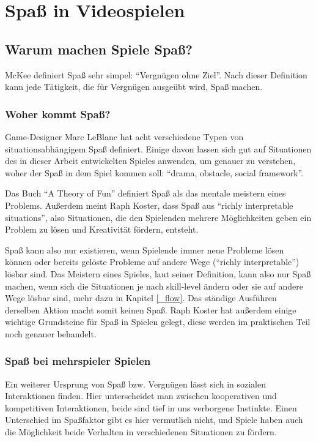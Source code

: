 \chapter{Spaß in Videospielen}

\section{Warum machen Spiele Spaß?}

McKee definiert Spaß sehr simpel: "`Vergnügen ohne Ziel"'. Nach dieser Definition kann jede Tätigkeit, die für Vergnügen ausgeübt wird, Spaß machen\cite{_fun}.

\subsection{Woher kommt Spaß?}

Game-Designer Marc LeBlanc hat acht verschiedene Typen von situationsabhängigem Spaß definiert. Einige davon lassen sich gut auf Situationen des in dieser Arbeit entwickelten Spieles anwenden, um genauer zu verstehen, woher der Spaß in dem Spiel kommen soll: "`drama, obstacle, social framework"'. 

Das Buch "`A Theory of Fun"'\cite{_theory_of_fun} definiert Spaß als das mentale meistern eines Problems\cite[S. 71]{_theory_of_fun}. Außerdem meint Raph Koster, dass Spaß aus "`richly interpretable situations"'\cite[S. 40]{_theory_of_fun}, also Situationen, die den Spielenden mehrere Möglichkeiten geben ein Problem zu lösen und Kreativität fördern, entsteht. 

Spaß kann also nur existieren, wenn Spielende immer neue Probleme lösen können oder bereits gelöste Probleme auf andere Wege ("`richly interpretable"') lösbar sind. Das Meistern eines Spieles, laut seiner Definition, kann also nur Spaß machen, wenn sich die Situationen je nach skill-level ändern oder sie auf andere Wege lösbar sind, mehr dazu in Kapitel \ref{_flow}. Das ständige Ausführen derselben Aktion macht somit keinen Spaß. Raph Koster hat außerdem einige wichtige Grundsteine für Spaß in Spielen gelegt, diese werden im praktischen Teil noch genauer behandelt.

\subsection{Spaß bei mehrspieler Spielen}

Ein weiterer Ursprung von Spaß bzw. Vergnügen lässt sich in sozialen Interaktionen finden\cite[S. 72]{_theory_of_fun}. Hier unterscheidet man zwischen kooperativen und kompetitiven Interaktionen, beide sind tief in uns verborgene Instinkte\cite[S. 310]{_art_of_gamedesign}. Einen Unterschied im Spaßfaktor gibt es hier vermutlich nicht\cite{_competition_vs_cooperation}, und Spiele haben auch die Möglichkeit beide Verhalten in verschiedenen Situationen zu fördern.

